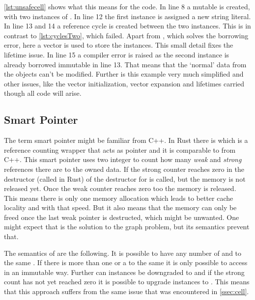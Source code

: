 \documentclass[thesis]{subfiles}
\begin{document}
    \autoref{lst:unsafecell} shows what this means for the code.
    In line 8 a mutable  is created, with two instances of \Node.
    In line 12 the first instance is assigned a new string literal.
    In line 13 and 14 a reference cycle is created between the two  instances.
    This is in contrast to \autoref{lst:cyclesTwo}, which failed.
    Apart from , which solves the borrowing error, here a vector is used to store the \Node instances.
    This small detail fixes the lifetime issue.
    In line 15 a compiler error is raised as the second \Node instance is already borrowed immutable in line 13.
    That means that the `normal' data from the objects can't be modified.
    Further is this example very much simplified and other issues, like the vector initialization, vector expansion and lifetimes carried though all code will arise.

    

  \subsection{Smart Pointer}
    The term smart pointer might be familiar from C++.
    In Rust there is \RcT which is a reference counting wrapper that acts as pointer and it is comparable to  from C++.
    This smart pointer uses two integer to count how many \emph{weak} and \emph{strong} references there are to the owned data.
    If the strong counter reaches zero in the destructor (called  in Rust) of \RcT the destructor for  is called, but the memory is not released yet.
    Once the weak counter reaches zero too the memory is released.
    This means there is only one memory allocation which leads to better cache locality and with that speed.
    But it also means that the memory can only be freed once the last weak pointer is destructed, which might be unwanted.
    One might expect that \RcT is the solution to the graph problem, but its semantics prevent that.\autocite{rust-doc}

    The semantics of \RcT are the following.
    It is possible to have any number of \RcTs and \WeakTs to the same .
    If there is more than one \RcT or a \WeakT to the same  it is only possible to access  in an immutable way.
    Further can \RcT instances be downgraded to \WeakT and if the strong count has not yet reached zero it is possible to upgrade \WeakT instances to \RcT.
    This means that this approach suffers from the same issue that was encountered in \autoref{ssec:cell}.\autocite{rust-doc}
\end{document}
